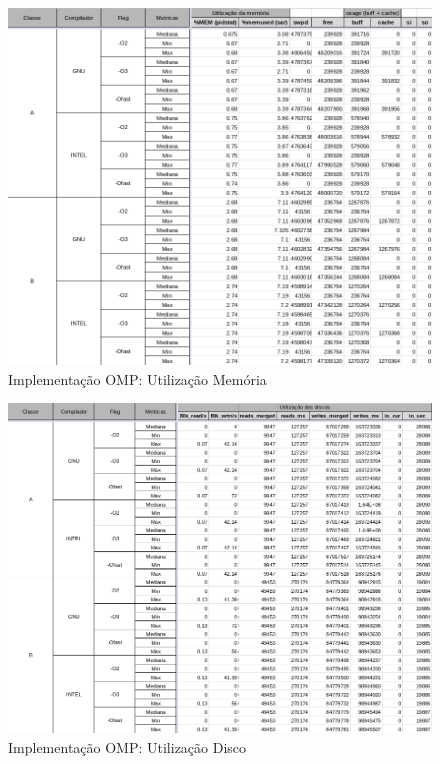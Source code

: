 \documentclass{article}
\begin{document}
\begin{appendices}
\begin{figure}[H]
    \centering
    \includegraphics[width=12cm]{Pictures/FT_r431_OMP_MEM.png}
    \caption{Implementação OMP: Utilização Memória}
    \label{figure:FT_r431_OMP_MEM}
\end{figure}

\begin{figure}[H]
    \centering
    \includegraphics[width=12cm]{Pictures/FT_r431_OMP_DISK.png}
    \caption{Implementação OMP: Utilização Disco}
    \label{figure:FT_r431_OMP_DISK}
\end{figure}


\end{appendices}
\end{document}
